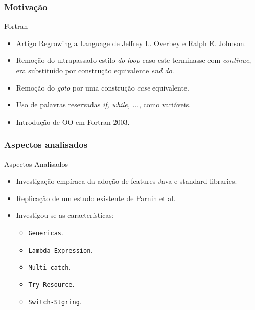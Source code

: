\documentclass[]{beamer}
\begin{document}
	\begin{frame}[label=Motivação]
		\frametitle{Motivação}
		\begin{block}{Fortran}
			\begin{itemize}
				\item Artigo Regrowing a Language de Jeffrey L. Overbey e Ralph E. Johnson.
				
				\item Remoção do ultrapassado estilo \textit{do loop} caso este terminasse com \textit{continue}, era substituído por construção equivalente \textit{end do}.
				
				\item Remoção do \textit{goto} por uma construção \textit{case} equivalente.
				
				\item Uso de palavras reservadas \textit{if, while, ...}, como variáveis.
				
				\item Introdução de OO em Fortran 2003.
			\end{itemize}
		\end{block}
	\end{frame}
	
	\begin{frame}[label=AspectosAnalisados]
		\frametitle{Aspectos analisados}
		\begin{block}{Aspectos Analisados}
			\begin{itemize}
				\item Investigação empíraca da adoção de features Java e standard libraries.
				
				\item Replicação de um estudo existente de Parnin et al.
				
				\item Investigou-se as características:
					\begin{itemize}
						\item \texttt{Genericas}.
						\item \texttt{Lambda Expression}.
						\item \texttt{Multi-catch}.
						\item \texttt{Try-Resource}.
						\item \texttt{Switch-Stgring}.
					\end{itemize}
					
			\end{itemize}
		\end{block}
	\end{frame}
	
\end{document}
